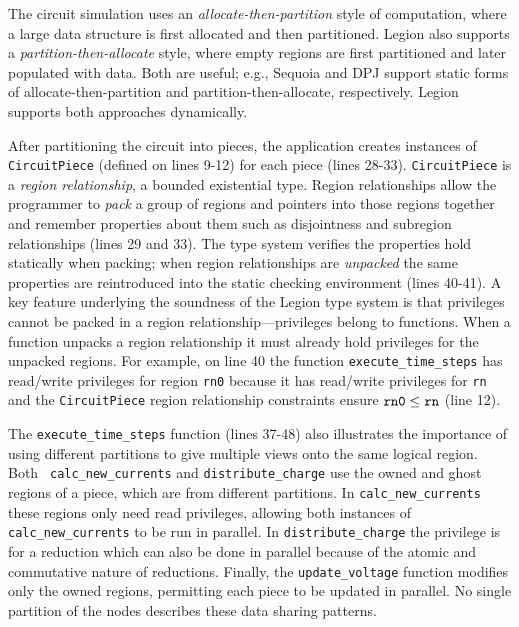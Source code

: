 The circuit simulation uses an {\em allocate-then-partition} style of
computation, where a large data structure is first allocated and then
partitioned.  Legion also supports a {\em partition-then-allocate} style,
where empty regions are first partitioned and later populated with
data.  Both are useful; e.g., Sequoia \cite{Fatahalian06} and DPJ
\cite{Bocchino09} support static forms of allocate-then-partition and
partition-then-allocate, respectively.  Legion supports both
approaches dynamically.

After partitioning the circuit into pieces, the application creates
instances of {\tt CircuitPiece} (defined on lines 9-12) for each piece
(lines 28-33).  {\tt CircuitPiece} is a {\em region relationship}, a
bounded existential type.  Region relationships allow the programmer
to {\em pack} a group of regions and pointers into those regions together
and remember properties
about them such as disjointness and subregion relationships (lines 29
and 33).  The type system verifies the properties hold statically when
packing; when region relationships are {\em unpacked} the same
properties are reintroduced into the static checking environment
(lines 40-41).  A key feature underlying the soundness of the Legion
type system is that privileges cannot be packed in a region
relationship---privileges belong to functions. When a function unpacks
a region relationship it must already hold privileges for the unpacked regions. 
For example, on line 40 the
function {\tt execute\_time\_steps} has read/write privileges for
region {\tt rn0} because it has read/write privileges for {\tt rn} and
the {\tt CircuitPiece} region relationship constraints ensure $\tt rn0
\leq rn$ (line 12).

The {\tt execute\_time\_steps} function (lines 37-48)  
also illustrates the importance of using different partitions to give
multiple views onto the same logical region.  Both {\tt
  calc\_new\_currents} and {\tt distribute\_charge} 
use the owned and ghost regions of a piece, which are from different partitions. In
{\tt calc\_new\_currents} these regions only need read
privileges, allowing both instances of {\tt calc\_new\_currents} to be
run in parallel.  In {\tt distribute\_charge} the
privilege is for a reduction which can also be done in parallel
because of the atomic and commutative nature of reductions.  Finally,
the {\tt update\_voltage} function modifies only the owned regions, permitting
each piece to be updated in parallel.  No
single partition of the nodes
describes these data sharing patterns.

